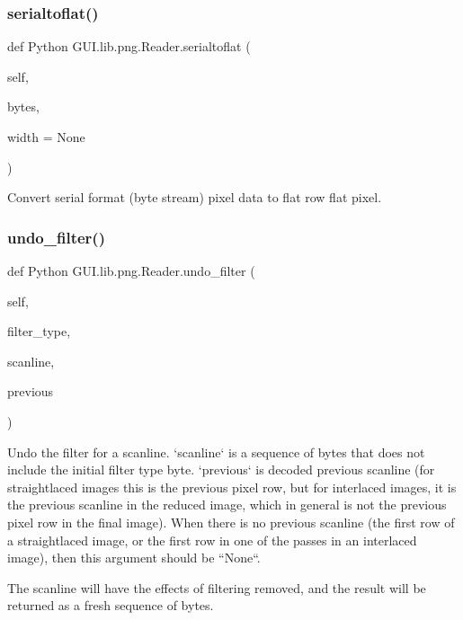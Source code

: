 \subsubsection{\texorpdfstring{serialtoflat()}{serialtoflat()}}
{\footnotesize\ttfamily def Python G\+U\+I.\+lib.\+png.\+Reader.\+serialtoflat (\begin{DoxyParamCaption}\item[{}]{self,  }\item[{}]{bytes,  }\item[{}]{width = {\ttfamily None} }\end{DoxyParamCaption})}

\begin{DoxyVerb}Convert serial format (byte stream) pixel data to flat row
flat pixel.
\end{DoxyVerb}
 \mbox{\label{class_python_01_g_u_i_1_1lib_1_1png_1_1_reader_a36ed43d219060dff3d3090e6b44dcec9}} 
\subsubsection{\texorpdfstring{undo\+\_\+filter()}{undo\_filter()}}
{\footnotesize\ttfamily def Python G\+U\+I.\+lib.\+png.\+Reader.\+undo\+\_\+filter (\begin{DoxyParamCaption}\item[{}]{self,  }\item[{}]{filter\+\_\+type,  }\item[{}]{scanline,  }\item[{}]{previous }\end{DoxyParamCaption})}

\begin{DoxyVerb}Undo the filter for a scanline.  `scanline` is a sequence of
bytes that does not include the initial filter type byte.
`previous` is decoded previous scanline (for straightlaced
images this is the previous pixel row, but for interlaced
images, it is the previous scanline in the reduced image, which
in general is not the previous pixel row in the final image).
When there is no previous scanline (the first row of a
straightlaced image, or the first row in one of the passes in an
interlaced image), then this argument should be ``None``.

The scanline will have the effects of filtering removed, and the
result will be returned as a fresh sequence of bytes.
\end{DoxyVerb}
 \mbox{\label{class_python_01_g_u_i_1_1lib_1_1png_1_1_reader_a517babe81ebf2d6f14346c82a2f6625a}} 
